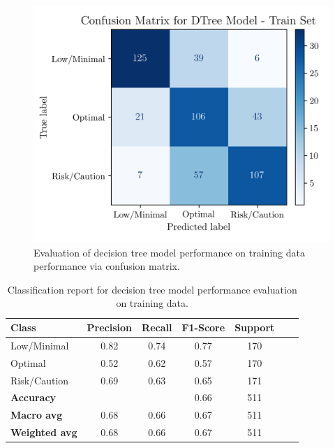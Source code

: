 \documentclass[conference]{IEEEtran}
\begin{document}
\begin{figure}[H]
    \centering
    \includegraphics[width=1\linewidth]{assets/DTREE_ConfusionMatrixTrain.png}
    \caption{Evaluation of decision tree model performance on training data performance via confusion matrix.}
    \label{dtree_cmtrain}
\end{figure} %

\begin{table}[H]
\centering
\caption{Classification report for decision tree model performance evaluation on training data.}
\label{cr_dtree_train}
\begin{tabular}{lcccccc}
\toprule
\textbf{Class} & \textbf{Precision} & \textbf{Recall} & \textbf{F1-Score} & \textbf{Support} \\
\midrule
Low/Minimal & 0.82 & 0.74 & 0.77 & 170 \\
Optimal & 0.52 & 0.62 & 0.57 & 170 \\
Risk/Caution & 0.69 & 0.63 & 0.65 & 171 \\
\midrule
\textbf{Accuracy} &  &  & 0.66 & 511 \\
\textbf{Macro avg} & 0.68 & 0.66 & 0.67 & 511 \\
\textbf{Weighted avg} & 0.68 & 0.66 & 0.67 & 511 \\
\bottomrule
\end{tabular}
\end{table} %
\end{document}
